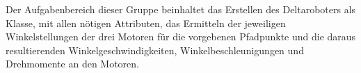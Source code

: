 Der Aufgabenbereich dieser Gruppe beinhaltet das Erstellen des Deltaroboters als Klasse, mit allen nötigen Attributen, das Ermitteln der jeweiligen Winkelstellungen der drei Motoren für die vorgebenen Pfadpunkte und die daraus resultierenden Winkelgeschwindigkeiten, Winkelbeschleunigungen und Drehmomente an den Motoren.